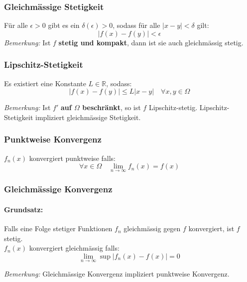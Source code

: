 \documentclass[11pt]{article}
\begin{document}
\subsubsection*{Gleichm{\"a}ssige Stetigkeit}
F{\"u}r alle $\epsilon > 0$ gibt es ein $\delta(\epsilon) >0$, sodass f{\"u}r alle $|x-y|<\delta$ gilt:
\begin{equation*}
	|f(x)-f(y)| < \epsilon
\end{equation*}
\emph{Bemerkung:} Ist $f$ \textbf{stetig und kompakt}, dann ist sie auch gleichm{\"a}ssig stetig.

\subsubsection*{Lipschitz-Stetigkeit}
Es existiert eine Konstante $L\in \mathbb{R}$, sodass:
\begin{equation*}
	|f(x)-f(y)|\leq L|x-y| \quad \forall x,y \in \Omega
\end{equation*}

\emph{Bemerkung:} Ist $f'$ \textbf{auf $\Omega$ beschr{\"a}nkt}, so ist $f$ Lipschitz-stetig. Lipschitz-Stetigkeit impliziert gleichm{\"a}ssige Stetigkeit.

\subsubsection*{Punktweise Konvergenz}
$f_n(x)$ konvergiert punktweise falls:
\begin{equation*}
	\forall x\in \Omega \quad \lim_{n\rightarrow\infty}f_n(x) = f(x)
\end{equation*}

\subsubsection*{Gleichm{\"a}ssige Konvergenz}

\paragraph{Grundsatz:} Falls eine Folge stetiger Funktionen $f_n$ gleichm{\"a}ssig gegen $f$ konvergiert, ist $f$ stetig.\\

$f_n(x)$ konvergiert gleichm{\"a}ssig falls:
\begin{equation*}
	\lim_{n\rightarrow\infty} \sup|f_n(x) - f(x)| = 0
\end{equation*}

\emph{Bemerkung:} Gleichm{\"a}ssige Konvergenz impliziert punktweise Konvergenz.
\end{document}
